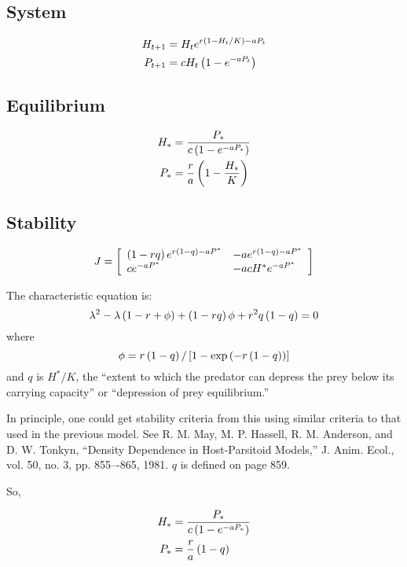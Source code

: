 \documentclass{article}
\begin{document}
\subsection{System}
\begin{align*}
H_{t+1} &= H_t e^{r \left(1-H_t/K\right) -a P_t}\\
P_{t+1} &= c H_t \left(1-e^{-a P_t}\right)
\end{align*}

\subsection{Equilibrium}
\begin{align*}
    H_* &= \frac{P_*}{c \left(1-e^{-a P_*}\right)}\\
    P_* &= \frac{r}{a} \left(1-\frac{H_*}{K}\right)
\end{align*}

\subsection{Stability}
\begin{equation*}
    J = \left[
        \begin{array}{ll}
        \left(1-rq\right)e^{r\left(1-q\right)-aP^*} &
        -a e^{r\left(1-q\right)-aP^*}\\
        ce^{-aP^*} &
        -acH^*e^{-aP^*}
        \end{array}
    \right]
\end{equation*}

The characteristic equation is:
\begin{equation*}
    \lambda^2-\lambda \left(1-r+\phi\right) + \left(1 - rq\right)\phi + r^2q\left(1-q\right) = 0
\end{equation*}
where
\begin{equation*}
\phi = r\left(1-q\right) / \left[1 - \exp{\left(-r\left(1-q\right)\right)}\right]
\end{equation*}
and $q$ is $H^* / K$, the ``extent to which the predator can depress the prey below its carrying capacity'' or ``depression of prey equilibrium.'' 

In principle, one could get stability criteria from this using similar criteria to that used in the previous model. See R. M. May, M. P. Hassell, R. M. Anderson, and D. W. Tonkyn, “Density Dependence in Host-Parsitoid Models,” J. Anim. Ecol., vol. 50, no. 3, pp. 855–-865, 1981. $q$ is defined on page 859.

So,

\begin{align*}
    H_* &= \frac{P_*}{c \left(1-e^{-aP_*}\right)}\\
    P_* &= \frac{r}{a} \left(1-q\right)
\end{align*}
\end{document}

